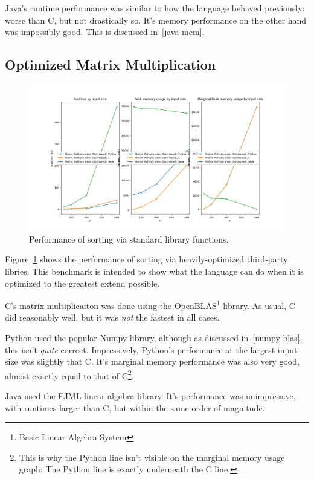 \documentclass[12pt,letterpaper]{article}
\begin{document}
Java's runtime performance was similar to how the language behaved previously:
worse than C, but not drastically so. It's memory performance on the other hand
was impossibly good. This is discussed in~\ref{java-mem}.

\subsection{Optimized Matrix Multiplication}\label{matmul-opt}

\begin{figure}[h!]
  \centering
  \includegraphics[width=\textwidth]{./matmul_optimized-plot.png}
  \caption{Performance of sorting via standard library functions.}
  \label{plot-matmul-opt}
\end{figure}

Figure~\ref{plot-matmul-opt} shows the performance of sorting via
heavily-optimized third-party libries. This benchmark is intended to show what
the language can do when it is optimized to the greatest extend possible.

C's matrix multiplicaiton was done using the OpenBLAS\footnote{Basic Linear
Algebra System} library. As usual, C did reasonably well, but it was \emph{not}
the fastest in all cases.

Python used the popular Numpy library, although as discussed
in~\ref{numpy-blas}, this isn't \emph{quite} correct. Impressively, Python's
performance at the largest input size was slightly that C. It's marginal memory
performance was also very good, almost exactly equal to that of C\footnote{This
is why the Python line isn't visible on the marginal memory usage graph: The
Python line is exactly underneath the C line.}.

Java used the EJML linear algebra library. It's performance was unimpressive,
with runtimes larger than C, but within the same order of magnitude.
\end{document}
